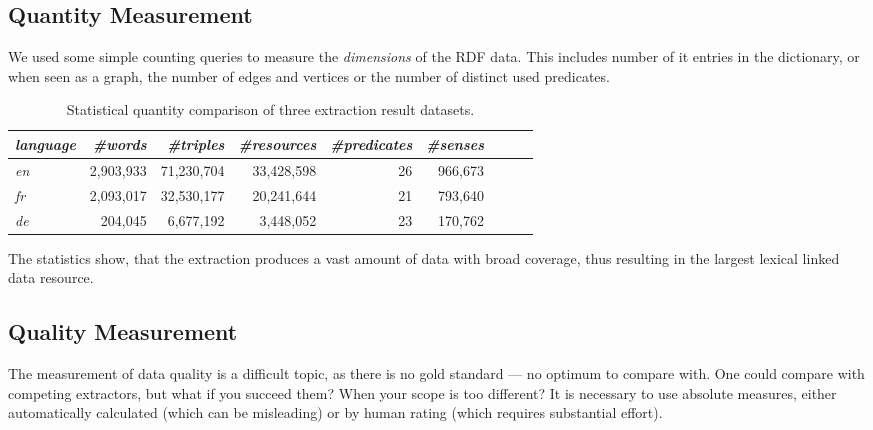 \subsection{Quantity Measurement}
We used some simple counting queries to measure the \textit{dimensions} of the RDF data. This includes number of it entries in the dictionary, or when seen as a graph, the number of edges and vertices or the number of distinct used predicates. 
\begin{table}[h!]
\centering
\caption{Statistical quantity comparison of three \wik extraction result datasets.}
\begin{tabular}{|l|r|r|r|r|r|r|r|r|}
\hline \emph{language} & \emph{\#words} & \emph{\#triples} & \emph{\#resources}  & \emph{\#predicates} & \emph{\#senses} \\ 
\hline \hline \textit{en} & 2,903,933 & 71,230,704 & 33,428,598 & 26 & 966,673 \\ 
\hline \textit{fr} & 2,093,017 & 32,530,177 & 20,241,644 & 21 & 793,640 \\ 
\hline \textit{de} & 204,045 & 6,677,192 & 3,448,052 & 23 & 170,762 \\ 
\hline 
\end{tabular}
\end{table}

The statistics show, that the extraction produces a vast amount of data with broad coverage, thus resulting in the largest lexical linked data resource. 


\subsection{Quality Measurement}
The measurement of data quality is a difficult topic, as there is no gold standard --- no optimum to compare with. 
One could compare with competing extractors, but what if you succeed them? 
When your scope is too different? 
It is necessary to use absolute measures, either automatically calculated (which can be misleading) or by human rating (which requires substantial effort).

